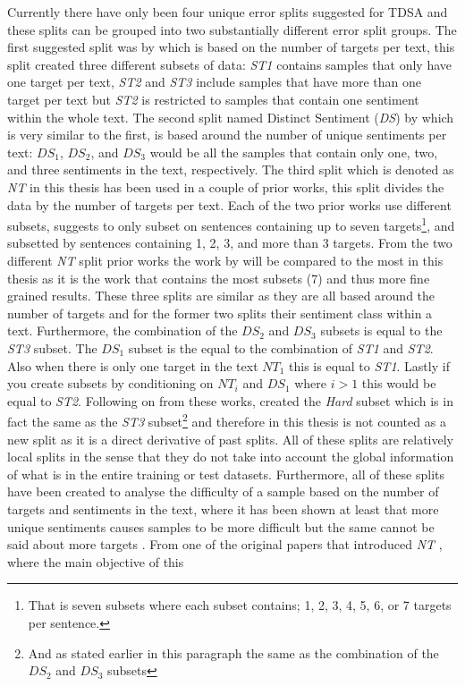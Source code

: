 Currently there have only been four unique error splits suggested for TDSA and these splits can be grouped into two substantially different error split groups. The first suggested split was by \citet{aug_nguyen-shirai-2015-phrasernn} which is based on the number of targets per text, this split created three different subsets of data: \textit{ST1} contains samples that only have one target per text, \textit{ST2} and \textit{ST3} include samples that have more than one target per text but \textit{ST2} is restricted to samples that contain one sentiment within the whole text. The second split named Distinct Sentiment (\textit{DS}) by \citet{aug_wang-etal-2017-tdparse} which is very similar to the first, is based around the number of unique sentiments per text: $DS_1$, $DS_2$, and $DS_3$ would be all the samples that contain only one, two, and three sentiments in the text, respectively. The third split which is denoted as \textit{NT} in this thesis has been used in a couple of prior works\citep{he-etal-2018-exploiting, aug_zhang2019aspectbased}, this split divides the data by the number of targets per text. Each of the two prior works use different subsets, \citet{aug_zhang2019aspectbased} suggests to only subset on sentences containing up to seven targets\footnote{That is seven subsets where each subset contains; 1, 2, 3, 4, 5, 6, or 7 targets per sentence.}, and \citet{he-etal-2018-exploiting} subsetted by sentences containing 1, 2, 3, and more than 3 targets. From the two different \textit{NT} split prior works the work by \citet{aug_zhang2019aspectbased} will be compared to the most in this thesis as it is the work that contains the most subsets (7) and thus more fine grained results. These three splits are similar as they are all based around the number of targets and for the former two splits their sentiment class within a text. Furthermore, the combination of the $DS_2$ and $DS_3$ subsets is equal to the \textit{ST3} subset. The $DS_1$ subset is the equal to the combination of \textit{ST1} and \textit{ST2}. Also when there is only one target in the text $NT_1$ this is equal to \textit{ST1}. Lastly if you create subsets by conditioning on $NT_i$ and $DS_1$ where $i>1$ this would be equal to \textit{ST2}. Following on from these works, \citet{aug_xue-li-2018-aspect} created the \textit{Hard} subset which is in fact the same as the \textit{ST3} subset\footnote{And as stated earlier in this paragraph the same as the combination of the $DS_2$ and $DS_3$ subsets} and therefore in this thesis is not counted as a new split as it is a direct derivative of past splits. All of these splits are relatively local splits in the sense that they do not take into account the global information of what is in the entire training or test datasets. Furthermore, all of these splits have been created to analyse the difficulty of a sample based on the number of targets and sentiments in the text, where it has been shown at least that more unique sentiments causes samples to be more difficult \citep{aug_wang-etal-2017-tdparse,aug_nguyen-shirai-2015-phrasernn} but the same cannot be said about more targets \citep{aug_zhang2019aspectbased,aug_nguyen-shirai-2015-phrasernn}. From one of the original papers that introduced \textit{NT} \citep{aug_zhang2019aspectbased}, where the main objective of this 